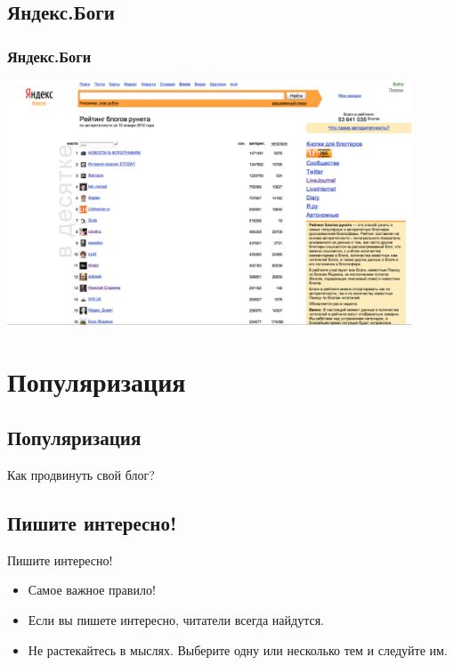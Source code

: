 \documentclass[compress,red]{beamer}
\begin{document}
\subsection{Яндекс.Боги}
\begin{frame}
  \frametitle{Яндекс.Боги}
	\centerline{\includegraphics[width=0.9\textwidth]{images/yandex-top.png}}
\end{frame}

\section{Популяризация}
\subsection{Популяризация}
\begin{frame}
	\begin{center}
	\Huge{Как продвинуть свой блог?}
	\end{center}
\end{frame}

\subsection{Пишите интересно!}
\begin{frame}
	\begin{center}
	\huge{Пишите интересно!}
	\end{center}
	\begin{itemize}
		\item Самое важное правило!
		\item Если вы пишете интересно, читатели всегда найдутся.
		\item Не растекайтесь в мыслях. Выберите одну или несколько тем и следуйте им.
	\end{itemize}
\end{frame}
\end{document}
